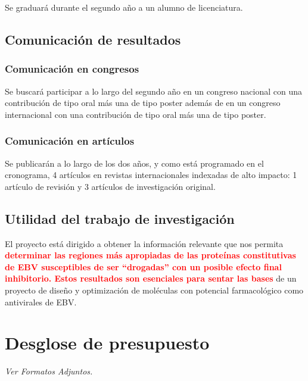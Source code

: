 \documentclass[12pt,letterpaper]{article} %
\newcommand{\red}[1]{\textcolor{red}{\textbf{#1}}}
\begin{document}
Se graduará durante el segundo año a un alumno de licenciatura.

\subsection{Comunicación de resultados}

\subsubsection{Comunicación en congresos}

Se buscará participar a lo largo del segundo año en un congreso nacional con una
contribución de tipo oral más una de tipo poster además de en un congreso internacional con
una contribución de tipo oral más una de tipo poster.

\subsubsection{Comunicación en artículos}

Se publicarán a lo largo de los dos años, y como está programado en el
cronograma, 4 artículos en revistas internacionales indexadas de alto impacto: 1
artículo de revisión y 3 artículos de investigación original.

\subsection{Utilidad del trabajo de investigación}

El proyecto está dirigido a obtener la información relevante que nos permita
\red{determinar las regiones más apropiadas de las proteínas constitutivas de
  EBV susceptibles de ser ``drogadas'' con un posible efecto final inhibitorio.
  Estos resultados son esenciales para sentar las bases} de un proyecto de
diseño y optimización de moléculas con potencial farmacológico como antivirales
de EBV.

\section{Desglose de presupuesto}
\emph{Ver Formatos Adjuntos.}


\newpage



\end{document}
